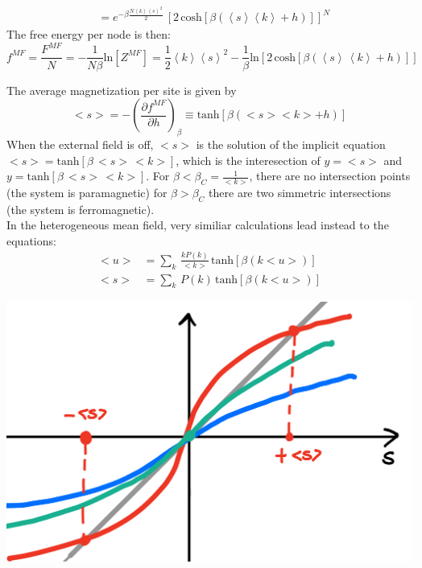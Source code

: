 {\begin{align*}
    &= e^{-\beta \frac{N \left\langle k \right \rangle\left\langle s \right \rangle^2}{2}}\,\left[2\,\text{cosh}\left[\beta(\left\langle s \right \rangle\left\langle k \right \rangle+h)\right]\right]^N
\end{align*}
The free energy per node is then:
\begin{equation*}
   f^{MF}= \frac{F^{MF}}{N} = - \frac{1}{N\beta}\text{ln}[Z^{MF}] = \frac{1}{2}\left\langle k \right \rangle\left\langle s \right \rangle^2 -\frac{1}{\beta}\text{ln}\left[2\,\text{cosh}[\beta(\left\langle s \right \rangle\,\left\langle k \right \rangle+h)]\right]
\end{equation*}
\begin{minipage}{0.55\textwidth}
The average magnetization per site is given by
\begin{equation*}
    <s> = -\left(\frac{\partial f^{MF}}{\partial h}\right)_\beta \equiv \text{tanh}[\beta(<s><k>+h)]
\end{equation*}
When the external field is off, $<s>$ is the solution of the implicit equation $<s> = \text{tanh}[\beta\,<s>\,<k>]$, which is the interesection of $y = <s>$ and $y = \text{tanh}[\beta\,<s>\,<k>]$.
For $\beta < \beta_C = \frac{1}{<k>}$, there are no intersection points (the system is paramagnetic) for $\beta > \beta_C$ there are two simmetric intersections (the system is ferromagnetic). \\
In the heterogeneous mean field, very similiar calculations \cite{analytical_ising} lead instead to the equations:
\begin{align*}
    <u> &= \sum_{k}\, \frac{k P(k)}{<k>}\,\text{tanh}[\beta ( k <u>)] \\ <s> &= \sum_k \, P(k)\,\text{tanh}[\beta ( k <u>)] 
\end{align*}
\end{minipage}
\hfill
\begin{minipage}{0.38\textwidth}
\centering
    \includegraphics[width = \textwidth]{latex_source/images/ising/IMG_56FE6CFC861B-1.jpeg}
\end{minipage}
}
